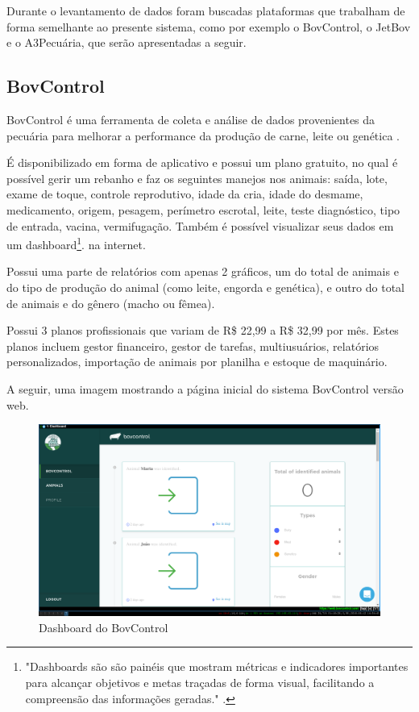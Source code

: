 \documentclass[12pt]{article}
\begin{document}

	Durante o levantamento de dados foram buscadas plataformas que trabalham de forma semelhante ao presente sistema, como por exemplo o BovControl, o JetBov e o A3Pecuária, que serão apresentadas a seguir.

	\subsection{BovControl}

	BovControl é uma ferramenta de coleta e análise de dados provenientes da pecuária para melhorar a performance da produção de carne, leite ou genética \cite{bovcontrol10}. 

	É disponibilizado em forma de aplicativo e possui um plano gratuito, no qual é possível gerir um rebanho e faz os seguintes manejos nos animais: saída, lote, exame de toque, controle reprodutivo, idade da cria, idade do desmame, medicamento, origem, pesagem, perímetro escrotal, leite, teste diagnóstico, tipo de entrada, vacina, vermifugação. Também é possível visualizar seus dados em um dashboard\footnote{"Dashboards são são painéis que mostram métricas e indicadores importantes para alcançar objetivos e metas traçadas de forma visual, facilitando a compreensão das informações geradas." \cite{nascimento17}.}. na internet.

	Possui uma parte de relatórios com apenas 2 gráficos, um do total de animais e do tipo de produção do animal (como leite, engorda e genética), e outro do total de animais e do gênero (macho ou fêmea). 

	Possui 3 planos profissionais que variam de R\$ 22,99 a R\$ 32,99 por mês. Estes planos incluem gestor financeiro, gestor de tarefas, multiusuários, relatórios personalizados, importação de animais por planilha e estoque de maquinário.  

	A seguir, uma imagem mostrando a página inicial do sistema BovControl versão web.

	\begin{figure}[!h]
		\begin{center}
			\caption{Dashboard do BovControl}
			\includegraphics[width=6in]{img/bovcontrol.png}

		\end{center}
	\end{figure}
\end{document}
